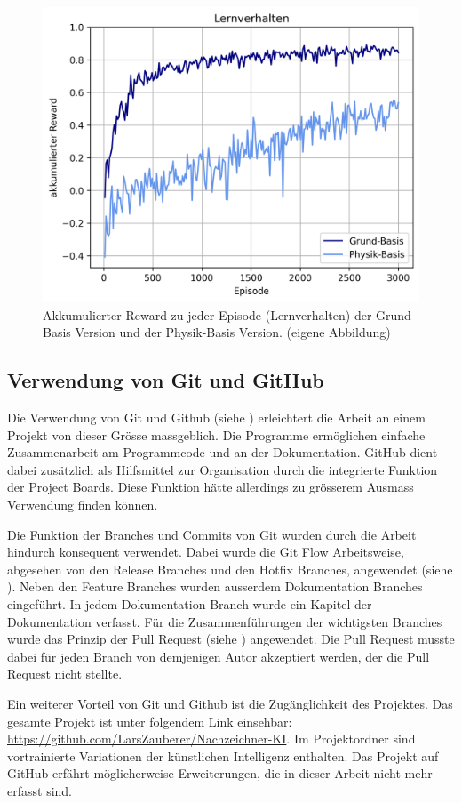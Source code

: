 \newpage 
\begin{figure}[!ht]
   \centering
   \includegraphics[width=\textwidth-2cm]{images/diskussion/learnplot.png}
   \caption{Akkumulierter Reward zu jeder Episode (Lernverhalten) der Grund-Basis Version und der Physik-Basis Version. (eigene Abbildung)}\label{fig:learnplot}
\end{figure}
 
 
\subsection{Verwendung von Git und GitHub}\label{sub:d_reflex_git} Die
Verwendung von Git und Github (siehe ) erleichtert die
Arbeit an einem Projekt von dieser Grösse massgeblich. Die Programme ermöglichen
einfache Zusammenarbeit am Programmcode und an der Dokumentation. GitHub dient
dabei zusätzlich als Hilfsmittel zur Organisation durch die integrierte Funktion
der Project Boards. Diese Funktion hätte allerdings zu grösserem Ausmass
Verwendung finden können.
 
Die Funktion der Branches und Commits von Git wurden durch die Arbeit hindurch
konsequent verwendet. Dabei wurde die Git Flow Arbeitsweise, abgesehen von den
Release Branches und den Hotfix Branches, angewendet (siehe
). Neben den Feature Branches wurden ausserdem
Dokumentation Branches eingeführt. In jedem Dokumentation Branch wurde ein
Kapitel der Dokumentation verfasst. Für die Zusammenführungen der wichtigsten
Branches wurde das Prinzip der Pull Request (siehe )
angewendet. Die Pull Request musste dabei für jeden Branch von demjenigen Autor
akzeptiert werden, der die Pull Request nicht stellte.

\newpage
Ein weiterer Vorteil von Git und Github ist die Zugänglichkeit des Projektes.
Das gesamte Projekt ist unter folgendem Link einsehbar:
\url{https://github.com/LarsZauberer/Nachzeichner-KI}. Im Projektordner sind
vortrainierte Variationen der künstlichen Intelligenz enthalten. Das Projekt auf
GitHub erfährt möglicherweise Erweiterungen, die in dieser Arbeit nicht mehr
erfasst sind.
